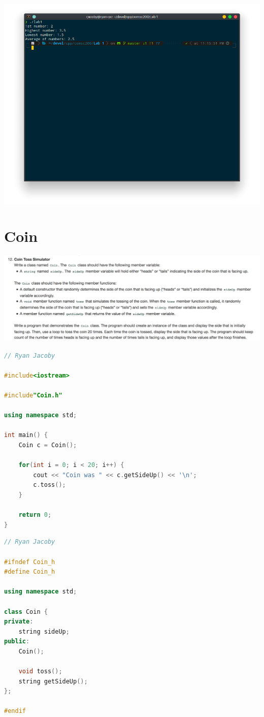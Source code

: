 \documentclass[letterpaper, 11pt]{article}
\begin{document}
\includegraphics[scale=0.5]{numbers_run.png} 

\section{Coin}

\includegraphics[scale=0.35]{coin.png} 

\begin{lstlisting}[language=C++, caption=main.cpp]
// Ryan Jacoby

#include<iostream>

#include"Coin.h"

using namespace std;

int main() {
    Coin c = Coin();

    for(int i = 0; i < 20; i++) {
        cout << "Coin was " << c.getSideUp() << '\n';
        c.toss();
    }

    return 0;
}
\end{lstlisting}

\begin{lstlisting}[language=C++, caption=Coin.h]
// Ryan Jacoby

#ifndef Coin_h
#define Coin_h

using namespace std;

class Coin {
private:
    string sideUp;
public:
    Coin();

    void toss();
    string getSideUp();
};

#endif
\end{lstlisting}
\end{document}
